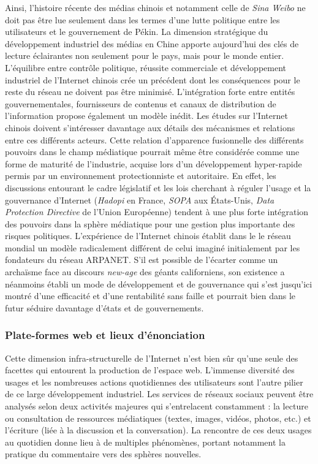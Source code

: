 Ainsi, l'histoire récente des médias chinois et notamment celle de \textit{Sina Weibo} ne doit pas être lue seulement dans les termes d'une lutte politique entre les utilisateurs et le gouvernement de Pékin. La dimension stratégique du développement industriel des médias en Chine apporte aujourd'hui des clés de lecture éclairantes non seulement pour le pays, mais pour le monde entier. L'équilibre entre contrôle politique, réussite commerciale et développement industriel de l'Internet chinois crée un précédent dont les conséquences pour le reste du réseau ne doivent pas être minimisé. L'intégration forte entre entités gouvernementales, fournisseurs de contenus et canaux de distribution de l'information propose également un modèle inédit. Les études sur l'Internet chinois doivent s'intéresser davantage aux détails des mécanismes et relations entre ces différents acteurs. Cette relation d'apparence fusionnelle des différents pouvoirs dans le champ médiatique pourrait même être considérée comme une forme de maturité de l'industrie, acquise lors d'un développement hyper-rapide permis par un environnement protectionniste et autoritaire. En effet, les  discussions entourant le cadre législatif et les lois cherchant à réguler l'usage et la gouvernance d'Internet (\textit{Hadopi} en France, \textit{SOPA} aux États-Unis, \textit{Data Protection Directive} de l'Union Européenne) tendent à une plus forte intégration des pouvoirs dans la sphère médiatique pour une gestion plus importante des risques politiques. L'expérience de l'Internet chinois établit dans le le réseau mondial un modèle  radicalement différent de celui imaginé initialement par les fondateurs du réseau ARPANET. S'il est possible de l'écarter comme un archaïsme face au discours \textit{new-age} des géants californiens, son existence a néanmoins établi un mode de développement et de gouvernance qui s'est jusqu'ici montré d'une efficacité et d'une rentabilité sans faille et pourrait bien dans le futur séduire davantage d'états et de gouvernements.

\subsubsection{Plate-formes web et lieux d'énonciation}

Cette dimension infra-structurelle de l'Internet n'est bien sûr qu'une seule des facettes qui entourent la production de l'espace web. L'immense diversité des usages et les nombreuses actions quotidiennes des utilisateurs sont l'autre pilier de ce large développement industriel. Les services de réseaux sociaux peuvent être analysés selon deux activités majeures qui s'entrelacent constamment : la lecture ou consultation de ressources médiatiques (textes, images, vidéos, photos, etc.) et l'écriture (liée à la discussion et la conversation). La rencontre de ces deux usages au quotidien donne lieu à de multiples phénomènes, portant notamment la pratique du commentaire vers des sphères nouvelles.

